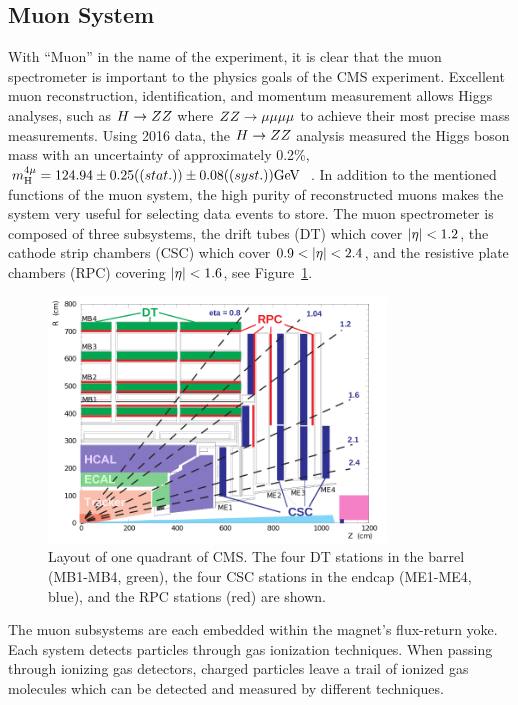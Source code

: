 \subsection{Muon System}
With ``Muon'' in the name of the experiment, it is clear that the muon spectrometer
is important to the physics goals of the CMS experiment. Excellent muon reconstruction, 
identification, and momentum measurement allows Higgs analyses, such as $H \to ZZ$
where $ZZ \to \mu\mu\mu\mu$ to achieve their most precise mass measurements. Using
2016 data, the $H \to ZZ$ analysis measured the Higgs boson mass with an uncertainty
of approximately 0.2\%, 
$m^{4\mu}_{\textrm{H}} = 124.94 \pm 0.25 ((stat.)) \pm 0.08 ((syst.))\mathrm{GeV}$~\cite{cms-2016-hzz}.
In addition to the mentioned functions of the muon system, the high purity of reconstructed
muons makes the system very useful for selecting data events to store.
The muon spectrometer is composed of three subsystems, the drift tubes (DT) which cover
$\lvert\eta\rvert < 1.2$, the cathode strip chambers (CSC) which cover $0.9 < \lvert\eta\rvert < 2.4$, and
the resistive plate chambers (RPC) covering $\lvert\eta\rvert < 1.6$, see Figure~\ref{fig:cms_muon_syst}.

\begin{figure}[htbp]
\centering
     \includegraphics[width=0.8\textwidth]{cms_and_lhc/plots/cms_muon_syst.png}
     \caption{
Layout of one quadrant of CMS. The four DT stations in the barrel (MB1-MB4, green), the four CSC stations in the endcap (ME1-ME4, blue), and the RPC stations (red) are shown.
     }
     \label{fig:cms_muon_syst}
\end{figure}

The muon subsystems are each embedded within the magnet's flux-return yoke. Each system
detects particles through gas ionization techniques. 
When passing through ionizing gas detectors, charged particles leave a trail of ionized gas 
molecules which can be detected and measured by different techniques.

